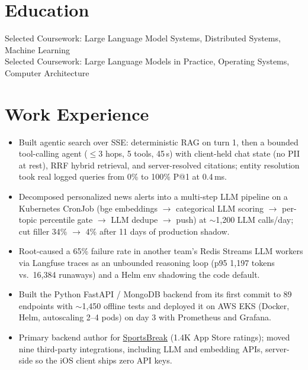 \documentclass[11pt, letterpaper]{article}
\begin{document}

\section{Education}
Selected Coursework: Large Language Model Systems, Distributed Systems, Machine Learning\\[1pt]
Selected Coursework: Large Language Models in Practice, Operating Systems, Computer Architecture

\section{Work Experience}
\begin{itemize}
  \item Built agentic search over SSE: deterministic RAG on turn 1, then a bounded tool-calling agent ($\le$3 hops, 5 tools, 45\,s) with client-held chat state (no PII at rest), RRF hybrid retrieval, and server-resolved citations; entity resolution took real logged queries from 0\% to 100\% P@1 at 0.4\,ms.
  \item Decomposed personalized news alerts into a multi-step LLM pipeline on a Kubernetes CronJob (bge embeddings $\to$ categorical LLM scoring $\to$ per-topic percentile gate $\to$ LLM dedupe $\to$ push) at $\sim$1{,}200 LLM calls/day; cut filler 34\% $\to$ 4\% after 11 days of production shadow.
  \item Root-caused a 65\% failure rate in another team's Redis Streams LLM workers via Langfuse traces as an unbounded reasoning loop (p95 1{,}197 tokens vs.\ 16{,}384 runaways) and a Helm env shadowing the code default.
  \item Built the Python FastAPI / MongoDB backend from its first commit to 89 endpoints with $\sim$1{,}450 offline tests and deployed it on AWS EKS (Docker, Helm, autoscaling 2--4 pods) on day 3 with Prometheus and Grafana.
  \item Primary backend author for \href{https://apps.apple.com/app/id6762649287}{SportsBreak} (1.4K App Store ratings); moved nine third-party integrations, including LLM and embedding APIs, server-side so the iOS client ships zero API keys.
\end{itemize}
\end{document}
